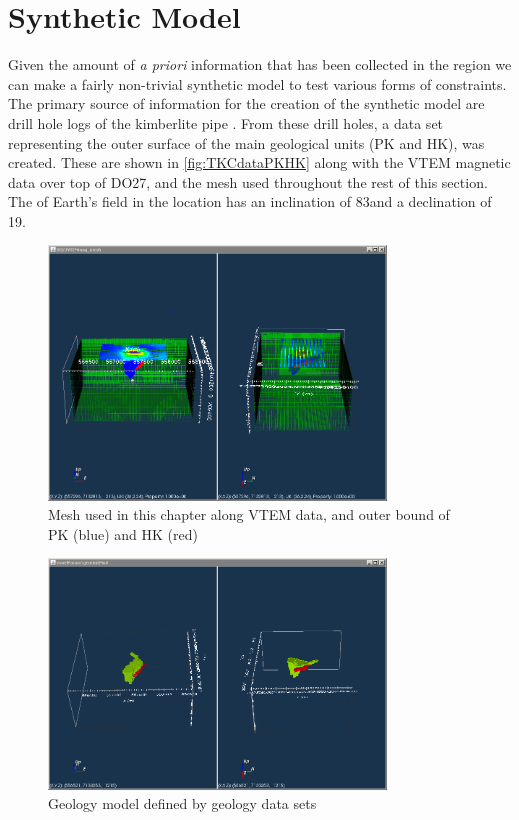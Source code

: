 \section{Synthetic Model }
\label{sec:Synthetic Model:TKC}
%
Given the amount of \emph{a priori} information that has been collected in the region we can make a fairly non-trivial synthetic model to test various forms of constraints. The primary source of information for the creation of the synthetic model are drill hole logs of the kimberlite pipe \cite{eggleston2014peregrine}. From these drill holes, a data set representing the outer surface of the main geological units (PK and HK), was created. These are shown in \autoref{fig:TKCdataPKHK} along with the VTEM magnetic data over top of DO27, and the mesh used throughout the rest of this section. The of Earth's field in the location has an inclination of 83\degree and a declination of 19\degree.
%
\begin{figure} [h]
   \centering
   \includegraphics[width=0.8\textwidth]{images/TKC/TKCdataPKHK.PNG}
   \caption{Mesh used in this chapter along VTEM data, and outer bound of PK (blue) and HK (red)}
   \label{fig:TKCdataPKHK}
\end{figure}
%

\begin{figure} [h]
   \centering
   \includegraphics[width=0.8\textwidth]{images/TKC/TKCgeoModel.PNG}
   \caption{Geology model defined by geology data sets}
   \label{fig:TKCgeoModel}
\end{figure}

